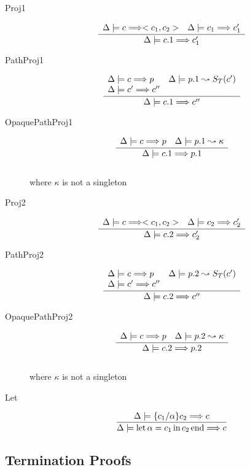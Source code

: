 \documentclass[12pt,twoside,fleqn]{amsart}
\theoremstyle{plain}
\theoremstyle{plain}
\theoremstyle{definition}
\begin{document}
\begin{description}
\item [Proj1]
\[
\frac{\begin{array}{ll}
\Delta  \models c  \Longrightarrow <c_{1},c_{2}>  & \Delta  \models c_{1}  \Longrightarrow c_{1}' 
\end{array} }{\Delta  \models c.1  \Longrightarrow c_{1}'  }\]

\item [PathProj1]
\[
\frac{\begin{array}{ll}
\Delta  \models c  \Longrightarrow p  & \Delta  \models p.1  \leadsto S_{T}(c' ) \\
\Delta  \models c' \Longrightarrow c'' & 
\end{array} }{\Delta  \models c.1  \Longrightarrow c''  }\]

\item [OpaquePathProj1]
\[
\frac{\begin{array}{ll}
\Delta  \models c  \Longrightarrow p  & \Delta  \models p.1  \leadsto \kappa  
\end{array} }{\Delta  \models c.1  \Longrightarrow p.1  }\]
\\
where \( \kappa  \) is not a singleton
\item [Proj2]
\[
\frac{\begin{array}{ll}
\Delta  \models c  \Longrightarrow <c_{1},c_{2}>  & \Delta  \models c_{2}  \Longrightarrow c_{2}' 
\end{array} }{\Delta  \models c.2  \Longrightarrow c_{2}'  }\]

\item [PathProj2]
\[
\frac{\begin{array}{ll}
\Delta  \models c  \Longrightarrow p  & \Delta  \models p.2  \leadsto S_{T}(c' ) \\
\Delta  \models c' \Longrightarrow c'' & 
\end{array} }{\Delta  \models c.2  \Longrightarrow c''  }\]

\item [OpaquePathProj2]
\[
\frac{\begin{array}{ll}
\Delta  \models c  \Longrightarrow p  & \Delta  \models p.2  \leadsto \kappa  
\end{array} }{\Delta  \models c.2  \Longrightarrow p.2  }\]
\\
where \( \kappa  \) is not a singleton
\item [Let]
\[
\frac{\Delta  \models \{c_{1} /\alpha  \}c_{2}  \Longrightarrow c  }{\Delta  \models \mathrm{let}\, \alpha  =c_{1} \, \mathrm{in}\, c_{2} \, \mathrm{end}  \Longrightarrow c  }\]
 
\end{description}

\subsection{Termination Proofs}


\newcommand{\csz}[1]{sz_{c}(#1 )}

\newcommand{\ksz}[1]{sz_{\kappa }(#1 )}
\end{document}
